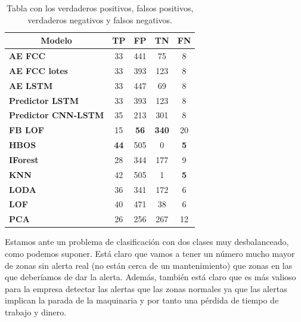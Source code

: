 \begin{table}[H]
	\centering
	\begin{tabular}{|l|c|c|c|c|}
		\hline
		\multicolumn{1}{|c|}{\textbf{Modelo}} & \textbf{TP} & \textbf{FP} & \textbf{TN}  & \textbf{FN} \\ \hline
		\textbf{AE FCC}                       & 33          & 441         & 75           & 8           \\ \hline
		\textbf{AE FCC lotes}                 & 33          & 393         & 123          & 8           \\ \hline
		\textbf{AE LSTM}                      & 33          & 447         & 69           & 8           \\ \hline
		\textbf{Predictor LSTM}               & 33          & 393         & 123          & 8           \\ \hline
		\textbf{Predictor CNN-LSTM}           & 35          & 213         & 301          & 8           \\ \hline
		\textbf{FB LOF}                       & 15          & \textbf{56} & \textbf{340} & 20          \\ \hline
		\textbf{HBOS}                         & \textbf{44} & 505         & 0            & \textbf{5}  \\ \hline
		\textbf{IForest}                      & 28          & 344         & 177          & 9           \\ \hline
		\textbf{KNN}                          & 42          & 505         & 1            & \textbf{5}  \\ \hline
		\textbf{LODA}                         & 36          & 341         & 172          & 6           \\ \hline
		\textbf{LOF}                          & 40          & 471         & 38           & 6           \\ \hline
		\textbf{PCA}                          & 26          & 256         & 267          & 12          \\ \hline
	\end{tabular}
	\caption{Tabla con los verdaderos positivos, falsos positivos, verdaderos negativos y falsos negativos.}
	\label{tabla:resultados2}
\end{table}

Estamos ante un problema de clasificación con dos clases muy desbalanceado, como podemos suponer. Está claro que vamos a tener un número mucho mayor de zonas sin alerta real (no están cerca de un mantenimiento) que zonas en las que deberíamos de dar la alerta. Además, también está claro que es más valioso para la empresa detectar las alertas que las zonas normales ya que las alertas implican la parada de la maquinaria y por tanto una pérdida de tiempo de trabajo y dinero.

